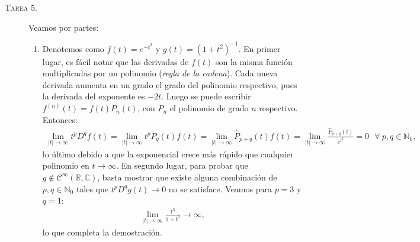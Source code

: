 \documentclass[spanish, fleqn]{article}
\begin{document}
\begin{description}
\begin{enumerate}
    \end{enumerate}




    \item[\textsc{Tarea 5.}] Veamos por partes:
    \begin{enumerate}
        \item Denotemos como $\displaystyle f(t)=e^{-t^2}$ y $\displaystyle g(t)=(1+t^2)^{-1}$. En primer lugar, es fácil notar que las derivadas de $f(t)$ son la misma función multiplicadas por un polinomio (\textit{regla de la cadena}). Cada nueva derivada aumenta en un grado el grado del polinomio respectivo, pues la derivada del exponente es $-2t$.
        Luego se puede escribir $f^{(n)}(t)=f(t)P_n(t)$, con $P_n$ el polinomio de grado $n$ respectivo. Entonces:
        \begin{align*}
            \lim_{|t|\rightarrow \infty} t^p D^q f(t) = \lim_{|t|\rightarrow \infty} t^p P_q(t) f(t) = \lim_{|t|\rightarrow \infty} \widehat{P}_{p+q}(t) f(t) = \lim_{|t|\rightarrow \infty} \frac{\widehat{P}_{p+q}(t)}{e^{t^2}} = 0 \ \ \ \forall \ p,q \in \mathbb{N}_0,
        \end{align*}
        lo último debido a que la exponencial crece más rápido que cualquier polinomio en $t \rightarrow \infty$. En segundo lugar, para probar que $g \notin \mathcal{C}^{\infty}(\mathbb{R},\mathbb{C})$, basta mostrar que existe alguna combinación de $p,q \in \mathbb{N}_0$ tales que $t^p D^q g(t) \rightarrow 0$ no se satisface. Veamos para $p=3$ y $q=1$:
        \begin{align*}
            \lim_{|t|\rightarrow \infty} \frac{t^3}{1+t^2} \rightarrow \infty,
        \end{align*}
        lo que completa la demostración.


\end{enumerate}
\end{description}
\end{document}
